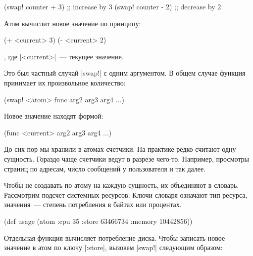 \begin{english}
  \begin{clojure}
(swap! counter + 3) ;; increase by 3
(swap! counter - 2) ;; decrease by 2
  \end{clojure}
\end{english}

Атом вычислит новое значение по принципу:

\begin{english}
  \begin{clojure}
(+ <current> 3)
(- <current> 2)
  \end{clojure}
\end{english}

\noindent
, где \spverb|<current>|~--- текущее значение.

Это был частный случай \spverb|swap!| с одним аргументом. В общем случае функция
принимает их произвольное количество:

\begin{english}
  \begin{clojure}
(swap! <atom> func arg2 arg3 arg4 ...)
  \end{clojure}
\end{english}

\noindent
Новое значение находят формой:

\begin{english}
  \begin{clojure}
(func <current> arg2 arg3 arg4 ...)
  \end{clojure}
\end{english}

До сих пор мы хранили в атомах счетчики. На практике редко считают одну
сущность. Гораздо чаще счетчики ведут в разрезе чего-то. Например, просмотры
страниц по адресам, число сообщений у пользователя и так далее.

Чтобы не создавать по атому на каждую сущность, их объединяют в
словарь. Рассмотрим подсчет системных ресурсов. Ключи словаря означают тип
ресурса, значения~--- степень потребления в байтах или процентах.

\begin{english}
  \begin{clojure}
(def usage
  (atom {:cpu 35
         :store 63466734
         :memory 10442856}))
  \end{clojure}
\end{english}

Отдельная функция вычисляет потребление диска. Чтобы записать новое значение в
атом по ключу \spverb|:store|, вызовем \spverb|swap!| следующим образом:

